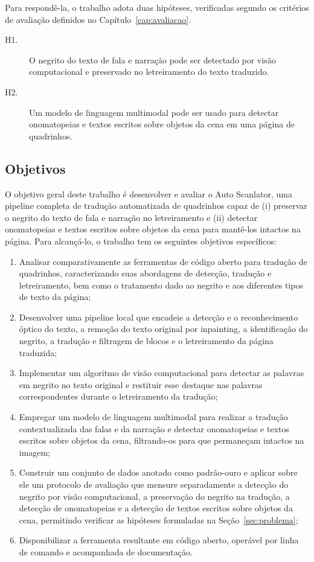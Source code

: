 \documentclass[
    12pt,
    openright,
    oneside,
    a4paper,
    chapter=TITLE,
    section=TITLE,
    english,
    brazilian,
    brazil
]{abntex2}
\begin{document}
Para respondê-la, o trabalho adota duas hipóteses, verificadas segundo os critérios de avaliação definidos no Capítulo~\ref{cap:avaliacao}.

\begin{description}
    \item[H1.] O negrito do texto de fala e narração pode ser detectado por visão computacional e preservado no letreiramento do texto traduzido.
    \item[H2.] Um modelo de linguagem multimodal pode ser usado para detectar onomatopeias e textos escritos sobre objetos da cena em uma página de quadrinhos.
\end{description}

\subsection{Objetivos}

O objetivo geral deste trabalho é desenvolver e avaliar o Auto Scanlator, uma pipeline completa de tradução automatizada de quadrinhos capaz de (i) preservar o negrito do texto de fala e narração no letreiramento e (ii) detectar onomatopeias e textos escritos sobre objetos da cena para mantê-los intactos na página. Para alcançá-lo, o trabalho tem os seguintes objetivos específicos:

\begin{enumerate}
    \item Analisar comparativamente as ferramentas de código aberto para tradução de quadrinhos, caracterizando suas abordagens de detecção, tradução e letreiramento, bem como o tratamento dado ao negrito e aos diferentes tipos de texto da página;
    \item Desenvolver uma pipeline local que encadeie a detecção e o reconhecimento óptico do texto, a remoção do texto original por inpainting, a identificação do negrito, a tradução e filtragem de blocos e o letreiramento da página traduzida;
    \item Implementar um algoritmo de visão computacional para detectar as palavras em negrito no texto original e restituir esse destaque nas palavras correspondentes durante o letreiramento da tradução;
    \item Empregar um modelo de linguagem multimodal para realizar a tradução contextualizada das falas e da narração e detectar onomatopeias e textos escritos sobre objetos da cena, filtrando-os para que permaneçam intactos na imagem;
    \item Construir um conjunto de dados anotado como padrão-ouro e aplicar sobre ele um protocolo de avaliação que mensure separadamente a detecção do negrito por visão computacional, a preservação do negrito na tradução, a detecção de onomatopeias e a detecção de textos escritos sobre objetos da cena, permitindo verificar as hipóteses formuladas na Seção~\ref{sec:problema};
    \item Disponibilizar a ferramenta resultante em código aberto, operável por linha de comando e acompanhada de documentação.
\end{enumerate}
\end{document}

